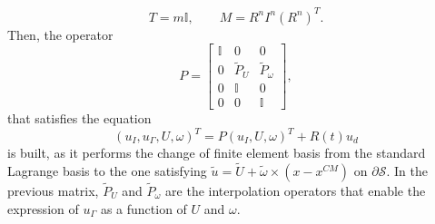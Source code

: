 \documentclass[graybox]{svmult}
\newcommand{\Vel}{u} %
\newcommand{\Pres}{p} %
\newcommand{\tvel}{U} %
\newcommand{\angvel}{\omega} %
\newcommand{\CenterMass}{x^{CM}} %
\newcommand{\Solid}{\mathcal{S}} %
\begin{document}
\begin{equation*}
	T = m\mathbb{I}, \qquad M = R^nI^n(R^n)^T.
\end{equation*}
Then, the operator 
\begin{equation*}
	P = \begin{bmatrix}
		\mathbb{I} &  0 & 0 \\
		0 & \tilde{P}_\tvel & \tilde{P}_\angvel\\
		0 &  \mathbb{I} & 0\\
		0 & 0 & \mathbb{I}
	\end{bmatrix}, 
\end{equation*}
that satisfies the equation
\begin{equation*}
 (\Vel_I,\Vel_\Gamma,\tvel,\angvel)^T =	P(\Vel_I,\tvel,\angvel)^T + R(t)u_d
\end{equation*}
is built, as it performs the change of finite element basis from the standard Lagrange basis to the one satisfying $\tilde{\Vel} = \tilde{\tvel} + \tilde{\angvel}\times (x-\CenterMass)$ on $\partial \Solid$. In the previous matrix, $\tilde{P}_\tvel$ and $ \tilde{P}_\angvel$ are the interpolation operators that enable the expression of $u_\Gamma$ as a function of $\tvel$ and $\angvel$. 
\end{document}
